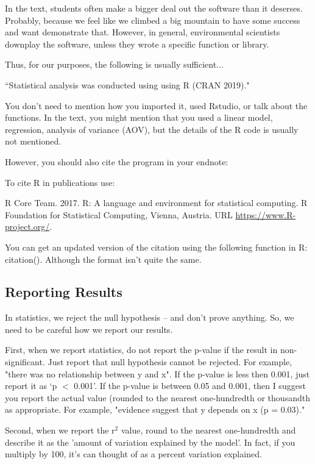 \documentclass{article}\usepackage[]{graphicx}\usepackage[]{color}
\begin{document}
In the text, students often make a bigger deal out the software than it deserses. Probably, because we feel like we climbed a big mountain to have some success and want demonstrate that. However, in general, environmental scientists downplay the software, unless they wrote a specific function or library. 

Thus, for our purposes, the following is usually sufficient...

\noindent ``Statistical analysis was conducted using using R (CRAN 2019)."

You don't need to mention how you imported it, used Rstudio, or talk about the functions. In the text, you might mention that you used a linear model, regression, analysis of variance (AOV), but the details of the R code is usually not mentioned.

However, you should also cite the program in your endnote: 

\smallskip
To cite R in publications use:

\medskip
\noindent R Core Team. 2017. R: A language and environment for statistical computing. R Foundation for Statistical Computing, Vienna, Austria. URL \url{https://www.R-project.org/}.

\smallskip

\noindent You can get an updated version of the citation using the following function in R: citation(). Although the format isn't quite the same.
  

\subsection{Reporting Results}

In statistics, we reject the null hypothesis -- and don't prove anything. So, we need to be careful how we report our results. 

First, when we report statistics, do not report the p-value if the result in non-significant. Just report that null hypothesis cannot be rejected. For example, "there was no relationship between y and x". If the p-value is less then 0.001, just report it as `p $<$ 0.001'. If the p-value is between 0.05 and 0.001, then I suggest you report the actual value (rounded to the nearest one-hundredth or thousandth as appropriate. For example, "evidence suggest that y depends on x (p = 0.03)." 

Second, when we report the r$^2$ value, round to the nearest one-hundredth and describe it as the 'amount of variation explained by the model'. In fact, if you multiply by 100, it's can thought of as a percent variation explained.
\end{document}

